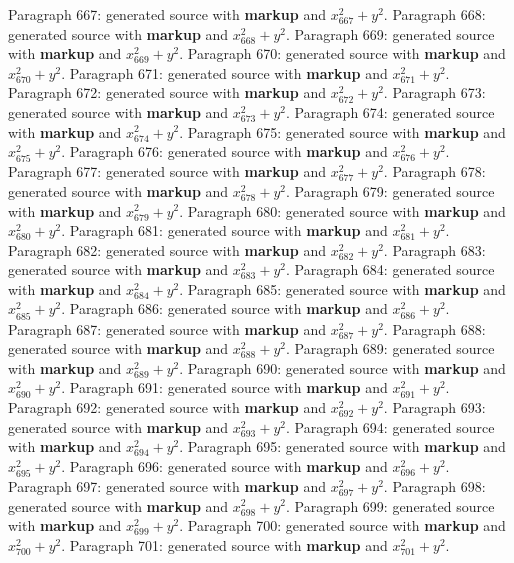\documentclass{article}
\begin{document}
Paragraph 667: generated source with \textbf{markup} and $x_{667}^2 + y^2$.
Paragraph 668: generated source with \textbf{markup} and $x_{668}^2 + y^2$.
Paragraph 669: generated source with \textbf{markup} and $x_{669}^2 + y^2$.
Paragraph 670: generated source with \textbf{markup} and $x_{670}^2 + y^2$.
Paragraph 671: generated source with \textbf{markup} and $x_{671}^2 + y^2$.
Paragraph 672: generated source with \textbf{markup} and $x_{672}^2 + y^2$.
Paragraph 673: generated source with \textbf{markup} and $x_{673}^2 + y^2$.
Paragraph 674: generated source with \textbf{markup} and $x_{674}^2 + y^2$.
Paragraph 675: generated source with \textbf{markup} and $x_{675}^2 + y^2$.
Paragraph 676: generated source with \textbf{markup} and $x_{676}^2 + y^2$.
Paragraph 677: generated source with \textbf{markup} and $x_{677}^2 + y^2$.
Paragraph 678: generated source with \textbf{markup} and $x_{678}^2 + y^2$.
Paragraph 679: generated source with \textbf{markup} and $x_{679}^2 + y^2$.
Paragraph 680: generated source with \textbf{markup} and $x_{680}^2 + y^2$.
Paragraph 681: generated source with \textbf{markup} and $x_{681}^2 + y^2$.
Paragraph 682: generated source with \textbf{markup} and $x_{682}^2 + y^2$.
Paragraph 683: generated source with \textbf{markup} and $x_{683}^2 + y^2$.
Paragraph 684: generated source with \textbf{markup} and $x_{684}^2 + y^2$.
Paragraph 685: generated source with \textbf{markup} and $x_{685}^2 + y^2$.
Paragraph 686: generated source with \textbf{markup} and $x_{686}^2 + y^2$.
Paragraph 687: generated source with \textbf{markup} and $x_{687}^2 + y^2$.
Paragraph 688: generated source with \textbf{markup} and $x_{688}^2 + y^2$.
Paragraph 689: generated source with \textbf{markup} and $x_{689}^2 + y^2$.
Paragraph 690: generated source with \textbf{markup} and $x_{690}^2 + y^2$.
Paragraph 691: generated source with \textbf{markup} and $x_{691}^2 + y^2$.
Paragraph 692: generated source with \textbf{markup} and $x_{692}^2 + y^2$.
Paragraph 693: generated source with \textbf{markup} and $x_{693}^2 + y^2$.
Paragraph 694: generated source with \textbf{markup} and $x_{694}^2 + y^2$.
Paragraph 695: generated source with \textbf{markup} and $x_{695}^2 + y^2$.
Paragraph 696: generated source with \textbf{markup} and $x_{696}^2 + y^2$.
Paragraph 697: generated source with \textbf{markup} and $x_{697}^2 + y^2$.
Paragraph 698: generated source with \textbf{markup} and $x_{698}^2 + y^2$.
Paragraph 699: generated source with \textbf{markup} and $x_{699}^2 + y^2$.
Paragraph 700: generated source with \textbf{markup} and $x_{700}^2 + y^2$.
Paragraph 701: generated source with \textbf{markup} and $x_{701}^2 + y^2$.
\end{document}
